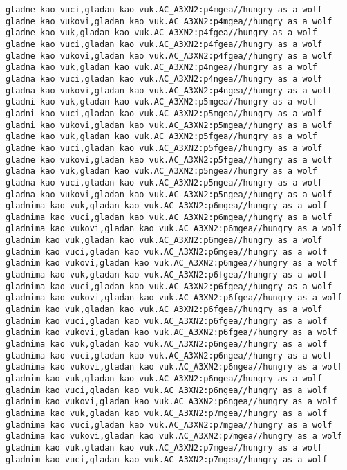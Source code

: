 \begin{verbatim}
gladne kao vuci,gladan kao vuk.AC_A3XN2:p4mgea//hungry as a wolf
gladne kao vukovi,gladan kao vuk.AC_A3XN2:p4mgea//hungry as a wolf
gladne kao vuk,gladan kao vuk.AC_A3XN2:p4fgea//hungry as a wolf
gladne kao vuci,gladan kao vuk.AC_A3XN2:p4fgea//hungry as a wolf
gladne kao vukovi,gladan kao vuk.AC_A3XN2:p4fgea//hungry as a wolf
gladna kao vuk,gladan kao vuk.AC_A3XN2:p4ngea//hungry as a wolf
gladna kao vuci,gladan kao vuk.AC_A3XN2:p4ngea//hungry as a wolf
gladna kao vukovi,gladan kao vuk.AC_A3XN2:p4ngea//hungry as a wolf
gladni kao vuk,gladan kao vuk.AC_A3XN2:p5mgea//hungry as a wolf
gladni kao vuci,gladan kao vuk.AC_A3XN2:p5mgea//hungry as a wolf
gladni kao vukovi,gladan kao vuk.AC_A3XN2:p5mgea//hungry as a wolf
gladne kao vuk,gladan kao vuk.AC_A3XN2:p5fgea//hungry as a wolf
gladne kao vuci,gladan kao vuk.AC_A3XN2:p5fgea//hungry as a wolf
gladne kao vukovi,gladan kao vuk.AC_A3XN2:p5fgea//hungry as a wolf
gladna kao vuk,gladan kao vuk.AC_A3XN2:p5ngea//hungry as a wolf
gladna kao vuci,gladan kao vuk.AC_A3XN2:p5ngea//hungry as a wolf
gladna kao vukovi,gladan kao vuk.AC_A3XN2:p5ngea//hungry as a wolf
gladnima kao vuk,gladan kao vuk.AC_A3XN2:p6mgea//hungry as a wolf
gladnima kao vuci,gladan kao vuk.AC_A3XN2:p6mgea//hungry as a wolf
gladnima kao vukovi,gladan kao vuk.AC_A3XN2:p6mgea//hungry as a wolf
gladnim kao vuk,gladan kao vuk.AC_A3XN2:p6mgea//hungry as a wolf
gladnim kao vuci,gladan kao vuk.AC_A3XN2:p6mgea//hungry as a wolf
gladnim kao vukovi,gladan kao vuk.AC_A3XN2:p6mgea//hungry as a wolf
gladnima kao vuk,gladan kao vuk.AC_A3XN2:p6fgea//hungry as a wolf
gladnima kao vuci,gladan kao vuk.AC_A3XN2:p6fgea//hungry as a wolf
gladnima kao vukovi,gladan kao vuk.AC_A3XN2:p6fgea//hungry as a wolf
gladnim kao vuk,gladan kao vuk.AC_A3XN2:p6fgea//hungry as a wolf
gladnim kao vuci,gladan kao vuk.AC_A3XN2:p6fgea//hungry as a wolf
gladnim kao vukovi,gladan kao vuk.AC_A3XN2:p6fgea//hungry as a wolf
gladnima kao vuk,gladan kao vuk.AC_A3XN2:p6ngea//hungry as a wolf
gladnima kao vuci,gladan kao vuk.AC_A3XN2:p6ngea//hungry as a wolf
gladnima kao vukovi,gladan kao vuk.AC_A3XN2:p6ngea//hungry as a wolf
gladnim kao vuk,gladan kao vuk.AC_A3XN2:p6ngea//hungry as a wolf
gladnim kao vuci,gladan kao vuk.AC_A3XN2:p6ngea//hungry as a wolf
gladnim kao vukovi,gladan kao vuk.AC_A3XN2:p6ngea//hungry as a wolf
gladnima kao vuk,gladan kao vuk.AC_A3XN2:p7mgea//hungry as a wolf
gladnima kao vuci,gladan kao vuk.AC_A3XN2:p7mgea//hungry as a wolf
gladnima kao vukovi,gladan kao vuk.AC_A3XN2:p7mgea//hungry as a wolf
gladnim kao vuk,gladan kao vuk.AC_A3XN2:p7mgea//hungry as a wolf
gladnim kao vuci,gladan kao vuk.AC_A3XN2:p7mgea//hungry as a wolf

\end{verbatim}
